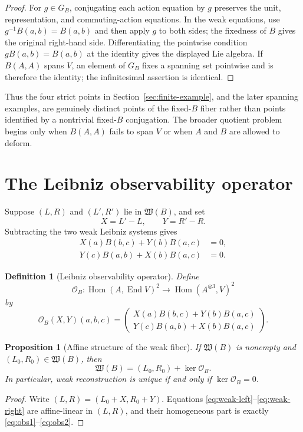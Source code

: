 \documentclass[11pt]{amsart}
\newtheorem{proposition}[theorem]{Proposition}
\newtheorem{definition}[theorem]{Definition}
\newcommand{\End}{\operatorname{End}}
\newcommand{\Hom}{\operatorname{Hom}}
\newcommand{\Wfib}{\mathfrak W}
\newcommand{\cO}{\mathcal O}
\begin{document}
\begin{proof}
For $g\in G_B$, conjugating each action equation by $g$ preserves the unit, representation, and commuting-action equations.  In the weak equations, use $g^{-1}B(a,b)=B(a,b)$ and then apply $g$ to both sides; the fixedness of $B$ gives the original right-hand side.  Differentiating the pointwise condition $gB(a,b)=B(a,b)$ at the identity gives the displayed Lie algebra.  If $B(A,A)$ spans $V$, an element of $G_B$ fixes a spanning set pointwise and is therefore the identity; the infinitesimal assertion is identical.
\end{proof}

Thus the four strict points in Section~\ref{sec:finite-example}, and the later spanning examples, are genuinely distinct points of the fixed-$B$ fiber rather than points identified by a nontrivial fixed-$B$ conjugation.  The broader quotient problem begins only when $B(A,A)$ fails to span $V$ or when $A$ and $B$ are allowed to deform.

\section{The Leibniz observability operator}

Suppose $(L,R)$ and $(L',R')$ lie in $\Wfib(B)$, and set
\[
X=L'-L,
\qquad
Y=R'-R.
\]
Subtracting the two weak Leibniz systems gives
\begin{align}
X(a)B(b,c)+Y(b)B(a,c)&=0, \label{eq:obs1}\\
Y(c)B(a,b)+X(b)B(a,c)&=0. \label{eq:obs2}
\end{align}

\begin{definition}[Leibniz observability operator]
Define
\[
\cO_B:\Hom(A,\End V)^2\longrightarrow \Hom(A^{\otimes3},V)^2
\]
by
\[
\cO_B(X,Y)(a,b,c)=
\begin{pmatrix}
X(a)B(b,c)+Y(b)B(a,c)\\
Y(c)B(a,b)+X(b)B(a,c)
\end{pmatrix}.
\]
\end{definition}

\begin{proposition}[Affine structure of the weak fiber]\label{prop:weak-affine}
If $\Wfib(B)$ is nonempty and $(L_0,R_0)\in\Wfib(B)$, then
\[
\Wfib(B)=(L_0,R_0)+\ker\cO_B.
\]
In particular, weak reconstruction is unique if and only if $\ker\cO_B=0$.
\end{proposition}

\begin{proof}
Write $(L,R)=(L_0+X,R_0+Y)$.  Equations \eqref{eq:weak-left}--\eqref{eq:weak-right} are affine-linear in $(L,R)$, and their homogeneous part is exactly \eqref{eq:obs1}--\eqref{eq:obs2}.
\end{proof}
\end{document}
